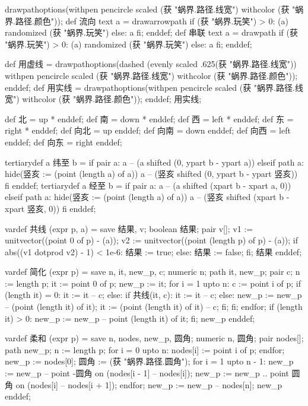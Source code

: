 \startMPinclusions[+]
drawpathoptions(withpen pencircle scaled (获 "蜗界.路径.线宽") withcolor (获 "蜗界.路径.颜色"));
def 流向 text a =
  drawarrowpath if (获 "蜗界.玩笑") > 0: (a) randomized (获 "蜗界.玩笑") else: a fi;
enddef;
def 串联 text a =
  drawpath if (获 "蜗界.玩笑") > 0: (a) randomized (获 "蜗界.玩笑") else: a fi;  
enddef;
\stopMPinclusions

\startMPinclusions[+]
def 用虚线 =
  drawpathoptions(dashed (evenly scaled .625(获 "蜗界.路径.线宽"))
                  withpen pencircle scaled (获 "蜗界.路径.线宽")
                  withcolor (获 "蜗界.路径.颜色"));
enddef;
def 用实线 =
  drawpathoptions(withpen pencircle scaled (获 "蜗界.路径.线宽")
                  withcolor (获 "蜗界.路径.颜色"));
enddef;
用实线;
\stopMPinclusions

\startMPinclusions[+]
def 北 = up * enddef; 
def 南 = down * enddef;
def 西 = left * enddef; 
def 东 = right * enddef;
def 向北 = up enddef; 
def 向南 = down enddef;
def 向西 = left enddef; 
def 向东 = right enddef;

tertiarydef a 纬至 b = 
  if pair a:
    a -- (a shifted (0, ypart b - ypart a))
  elseif path a:
    hide(竖亥 := (point (length a) of a))
    a -- (竖亥 shifted (0, ypart b - ypart 竖亥))
  fi
enddef;
tertiarydef a 经至 b = 
  if pair a:
    a -- (a shifted (xpart b - xpart a, 0))
  elseif path a:
    hide(竖亥 := (point (length a) of a))
    a -- (竖亥 shifted (xpart b - xpart 竖亥, 0))
  fi
enddef;
\stopMPinclusions

\startMPinclusions[+]
vardef 共线 (expr p, a) =
  save 结果, v; boolean 结果; pair v[];
  v1 := unitvector((point 0 of p) - (a));
  v2 := unitvector((point (length p) of p) - (a));
  if abs((v1 dotprod v2) - 1) < 1e-6:
     结果 := true;
  else:
    结果 := false;
  fi;
  结果
enddef;

vardef 简化 (expr p) =
  save n, it, new_p, c;
  numeric n; path it, new_p; pair c;
  n := length p;
  it := point 0 of p;
  new_p := it;
  for i = 1 upto n:
    c := point i of p;
    if (length it) = 0: 
      it := it -- c;
    else:
      if 共线(it, c):
        it := it -- c;
      else:
        new_p := new_p -- (point (length it) of it);
        it := (point (length it) of it) -- c;
      fi;
    fi;
  endfor;
  if (length it) > 0:
    new_p := new_p -- point (length it) of it;
  fi;
  new_p
enddef;

vardef 柔和 (expr p) =
  save n, nodes, new_p, 圆角; 
  numeric n, 圆角; pair nodes[]; path new_p;
  n := length p;
  for i = 0 upto n:
    nodes[i] := point i of p;
  endfor;
  new_p := nodes[0];
  圆角 := (获 "蜗界.路径.圆角");
  for i = 1 upto n - 1:
    new_p := new_p -- point -圆角 on (nodes[i - 1] -- nodes[i]);
    new_p := new_p .. point 圆角 on (nodes[i] -- nodes[i + 1]);
  endfor;
  new_p := new_p -- nodes[n];
  new_p
enddef;
\stopMPinclusions

